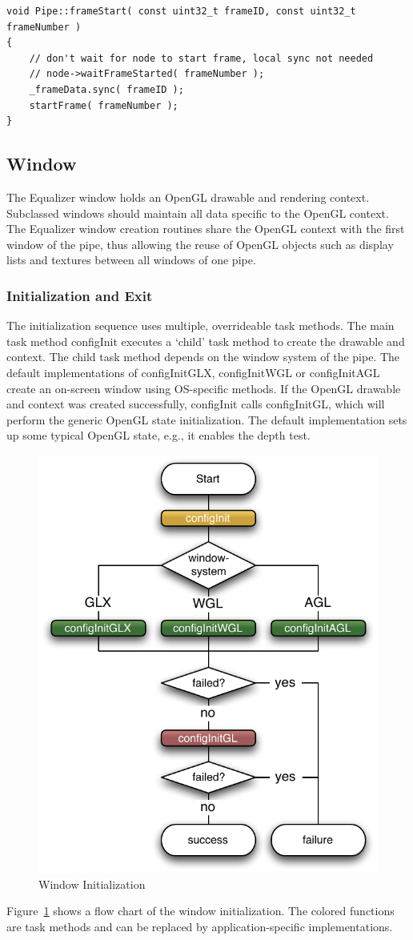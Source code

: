 \documentclass[10pt,a4]{scrartcl}
\newcommand{\fig}[1]{Figure~\ref{#1}}
\begin{document}
{\footnotesize\begin{lstlisting}
void Pipe::frameStart( const uint32_t frameID, const uint32_t frameNumber )
{
    // don't wait for node to start frame, local sync not needed
    // node->waitFrameStarted( frameNumber );
    _frameData.sync( frameID );
    startFrame( frameNumber );
}
\end{lstlisting}}


\subsection{Window}

The Equalizer window holds an OpenGL drawable and rendering
context. Subclassed windows should maintain all data specific to the
OpenGL context. The Equalizer window creation routines share the OpenGL
context with the first window of the pipe, thus allowing the reuse of
OpenGL objects such as display lists and textures between all 
windows of one pipe.

\subsubsection{Initialization and Exit}

The initialization sequence uses multiple, overrideable task
methods. The main task method \textsf{configInit} executes a `child'
task method to create the drawable and context. The child task method
depends on the window system of the pipe. The default implementations of
\textsf{configInitGLX}, \textsf{configInitWGL} or \textsf{configInitAGL}
create an on-screen window using OS-specific methods. If the OpenGL
drawable and context was created successfully, \textsf{configInit} calls
\textsf{configInitGL}, which will perform the generic OpenGL
state initialization. The default implementation sets up some typical
OpenGL state, e.g., it enables the depth test.

\begin{figure}
  \includegraphics[width=.4\textwidth]{images/windowInit.pdf}
  {\caption{\small\label{fWindowInit}Window Initialization}}
\end{figure}
\fig{fWindowInit} shows a flow chart of the window initialization. The
colored functions are task methods and can be replaced by
application-specific implementations.
\end{document}
